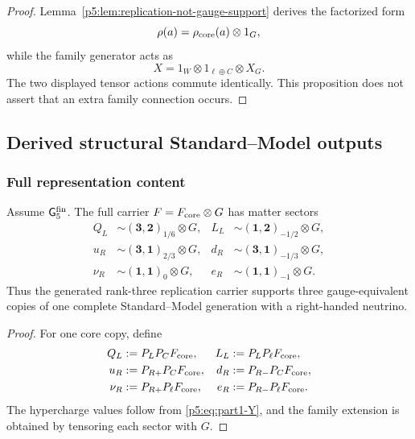\documentclass[12pt,a4paper]{article}
\begin{document}
\begin{proof}
Lemma~\ref{p5:lem:replication-not-gauge-support} derives the factorized form
\[
\rho(a)=\rho_{\rm core}(a)\otimes 1_G,
\]
while the family generator acts as
\[
X=1_W\otimes 1_{\ell\oplus C}\otimes X_G.
\]
The two displayed tensor actions commute identically.  This proposition does not assert that an extra family connection occurs.
\end{proof}

\subsection{Derived structural Standard--Model outputs}
\label{p5:sec:part1-outputs}

\subsubsection{Full representation content}
\label{p5:sec:part1-representation-content}

\begin{proposition}
\label{p5:prop:three-generation-content}
Assume
\(\mathsf G_5^{\rm fin}\).  The full carrier
\(F=F_{\rm core}\otimes G\) has matter sectors
\begin{align}
Q_L &\sim (\mathbf 3,\mathbf 2)_{1/6}\otimes G, &
L_L &\sim (\mathbf 1,\mathbf 2)_{-1/2}\otimes G, \\
u_R &\sim (\mathbf 3,\mathbf 1)_{2/3}\otimes G, &
d_R &\sim (\mathbf 3,\mathbf 1)_{-1/3}\otimes G, \\
\nu_R &\sim (\mathbf 1,\mathbf 1)_{0}\otimes G, &
e_R &\sim (\mathbf 1,\mathbf 1)_{-1}\otimes G.
\end{align}
Thus the generated rank-three replication carrier supports three
gauge-equivalent copies of one complete Standard--Model generation with a
right-handed neutrino.
\end{proposition}

\begin{proof}
For one core copy, define
\begin{align}
Q_L&:=P_LP_C F_{\rm core}, & L_L&:=P_LP_\ell F_{\rm core}, \\
u_R&:=P_{R+}P_C F_{\rm core}, & d_R&:=P_{R-}P_C F_{\rm core}, \\
\nu_R&:=P_{R+}P_\ell F_{\rm core}, & e_R&:=P_{R-}P_\ell F_{\rm core}.
\end{align}
The hypercharge values follow from \eqref{p5:eq:part1-Y}, and the family extension is obtained by tensoring each sector with \(G\).
\end{proof}
\end{document}
